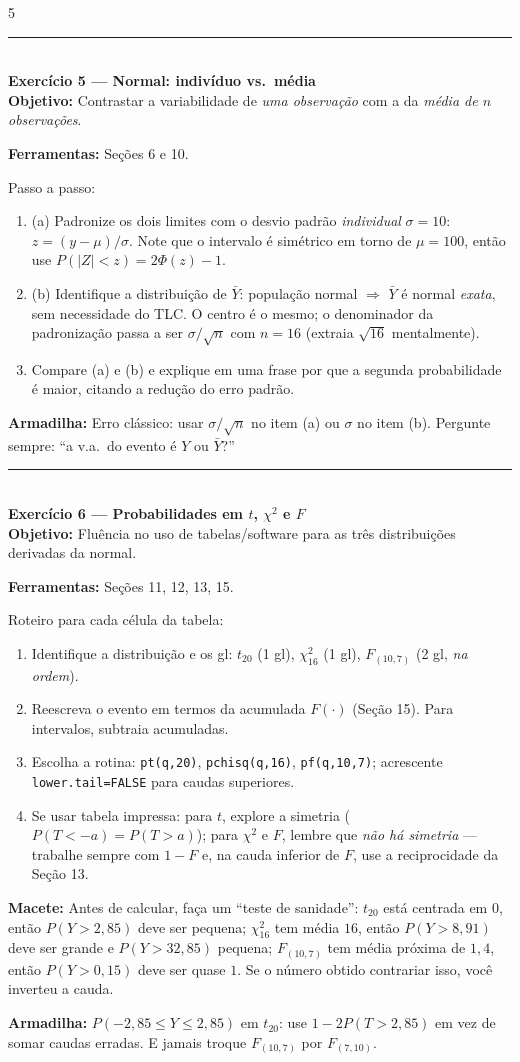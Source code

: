 \documentclass[a4paper,8pt]{extarticle}
\newcommand{\tit}[1]{\vspace{2pt}\textcolor{azul}{\rule{\linewidth}{0.6pt}}\\[1pt]\textbf{\textcolor{azul}{#1}}\\[1pt]}
\newcommand{\mac}[1]{\textcolor{verde}{\textbf{Macete:}} #1\par}
\newcommand{\arm}[1]{\textcolor{vinho}{\textbf{Armadilha:}} #1\par}
\newcommand{\ferr}[1]{\textbf{Ferramentas:} #1\par}
\newcommand{\obj}[1]{\textbf{Objetivo:} #1\par}
\newcommand{\R}[1]{\texttt{\footnotesize #1}}
\begin{document}
\begin{multicols*}{5}
\tit{Exercício 5 — Normal: indivíduo vs.\ média}
\obj{Contrastar a variabilidade de \emph{uma observação} com a da \emph{média de $n$ observações}.}
\ferr{Seções 6 e 10.}
Passo a passo:
\begin{enumerate}
\item (a) Padronize os dois limites com o desvio padrão \emph{individual} $\sigma=10$: $z=(y-\mu)/\sigma$. Note que o intervalo é simétrico em torno de $\mu=100$, então use $P(|Z|<z)=2\Phi(z)-1$.
\item (b) Identifique a distribuição de $\bar Y$: população normal $\Rightarrow$ $\bar Y$ é normal \emph{exata}, sem necessidade do TLC. O centro é o mesmo; o denominador da padronização passa a ser $\sigma/\sqrt{n}$ com $n=16$ (extraia $\sqrt{16}$ mentalmente).
\item Compare (a) e (b) e explique em uma frase por que a segunda probabilidade é maior, citando a redução do erro padrão.
\end{enumerate}
\arm{Erro clássico: usar $\sigma/\sqrt n$ no item (a) ou $\sigma$ no item (b). Pergunte sempre: “a v.a.\ do evento é $Y$ ou $\bar Y$?”}

\tit{Exercício 6 — Probabilidades em $t$, $\chi^2$ e $F$}
\obj{Fluência no uso de tabelas/software para as três distribuições derivadas da normal.}
\ferr{Seções 11, 12, 13, 15.}
Roteiro para cada célula da tabela:
\begin{enumerate}
\item Identifique a distribuição e os gl: $t_{20}$ (1 gl), $\chi^2_{16}$ (1 gl), $F_{(10,7)}$ (2 gl, \emph{na ordem}).
\item Reescreva o evento em termos da acumulada $F(\cdot)$ (Seção 15). Para intervalos, subtraia acumuladas.
\item Escolha a rotina: \R{pt(q,20)}, \R{pchisq(q,16)}, \R{pf(q,10,7)}; acrescente \R{lower.tail=FALSE} para caudas superiores.
\item Se usar tabela impressa: para $t$, explore a simetria ($P(T<-a)=P(T>a)$); para $\chi^2$ e $F$, lembre que \emph{não há simetria} — trabalhe sempre com $1-F$ e, na cauda inferior de $F$, use a reciprocidade da Seção 13.
\end{enumerate}
\mac{Antes de calcular, faça um “teste de sanidade”: $t_{20}$ está centrada em $0$, então $P(Y>2{,}85)$ deve ser pequena; $\chi^2_{16}$ tem média $16$, então $P(Y>8{,}91)$ deve ser grande e $P(Y>32{,}85)$ pequena; $F_{(10,7)}$ tem média próxima de $1{,}4$, então $P(Y>0{,}15)$ deve ser quase $1$. Se o número obtido contrariar isso, você inverteu a cauda.}
\arm{$P(-2{,}85\le Y\le 2{,}85)$ em $t_{20}$: use $1-2P(T>2{,}85)$ em vez de somar caudas erradas. E jamais troque $F_{(10,7)}$ por $F_{(7,10)}$.}


\end{multicols*}
\end{document}
